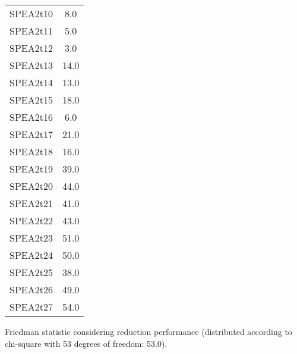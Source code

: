 \documentclass{article}
\begin{document}
\begin{table}[!htp]
\begin{tabular}{c|c}
SPEA2t10&8.0\\
SPEA2t11&5.0\\
SPEA2t12&3.0\\
SPEA2t13&14.0\\
SPEA2t14&13.0\\
SPEA2t15&18.0\\
SPEA2t16&6.0\\
SPEA2t17&21.0\\
SPEA2t18&16.0\\
SPEA2t19&39.0\\
SPEA2t20&44.0\\
SPEA2t21&41.0\\
SPEA2t22&43.0\\
SPEA2t23&51.0\\
SPEA2t24&50.0\\
SPEA2t25&38.0\\
SPEA2t26&49.0\\
SPEA2t27&54.0\\
\end{tabular}
\end{table}


Friedman statistic considering reduction performance (distributed according to chi-square with 53 degrees of freedom: 53.0).
\end{document}
